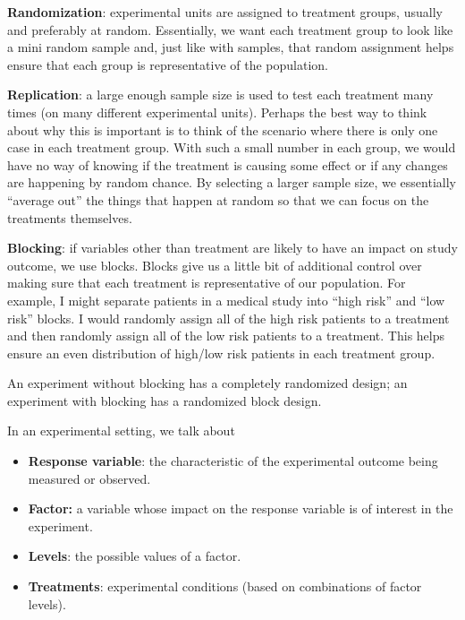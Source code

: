 \documentclass[
]{book}
\providecommand{\tightlist}{%
  \setlength{\itemsep}{0pt}\setlength{\parskip}{0pt}}
\begin{document}
\textbf{Randomization}: experimental units are assigned to treatment groups, usually and preferably at random. Essentially, we want each treatment group to look like a mini random sample and, just like with samples, that random assignment helps ensure that each group is representative of the population.

\textbf{Replication}: a large enough sample size is used to test each treatment many times (on many different experimental units). Perhaps the best way to think about why this is important is to think of the scenario where there is only one case in each treatment group. With such a small number in each group, we would have no way of knowing if the treatment is causing some effect or if any changes are happening by random chance. By selecting a larger sample size, we essentially ``average out'' the things that happen at random so that we can focus on the treatments themselves.

\textbf{Blocking}: if variables other than treatment are likely to have an impact on study outcome, we use blocks. Blocks give us a little bit of additional control over making sure that each treatment is representative of our population. For example, I might separate patients in a medical study into ``high risk'' and ``low risk'' blocks. I would randomly assign all of the high risk patients to a treatment and then randomly assign all of the low risk patients to a treatment. This helps ensure an even distribution of high/low risk patients in each treatment group.

An experiment without blocking has a completely randomized design; an experiment with blocking has a randomized block design.

In an experimental setting, we talk about

\begin{itemize}
\tightlist
\item
  \textbf{Response variable}: the characteristic of the experimental outcome being measured or observed.
\item
  \textbf{Factor:} a variable whose impact on the response variable is of interest in the experiment.
\item
  \textbf{Levels}: the possible values of a factor.
\item
  \textbf{Treatments}: experimental conditions (based on combinations of factor levels).
\end{itemize}
\end{document}
